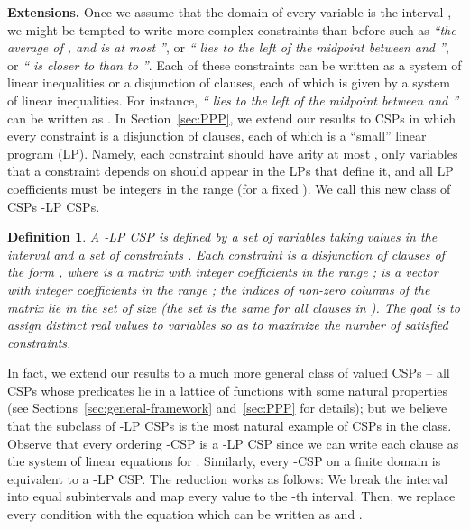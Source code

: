 \documentclass[11pt]{article}
\newtheorem{definition}[theorem]{Definition}
\begin{document}
\medskip

\noindent\textbf{Extensions.}
Once we assume that the domain of every variable is the interval , we might be tempted
to write more complex constraints than before such as
\emph{``the average of ,  and  is at most
''}, or \emph{`` lies to the left of the midpoint between  and ''},
or \emph{`` is closer to  than to ''}.
 Each of these constraints can be written as a system of linear inequalities or a disjunction of clauses,
 each of which is given by a system of linear inequalities. For instance,
  \emph{`` lies to the left of the midpoint between  and ''}
  can be written as  .
In Section~\ref{sec:PPP}, we extend our results to CSPs in which every constraint is a disjunction of clauses, each of which is
a ``small'' linear program (LP).
Namely, each constraint should have arity at most , only variables that a constraint depends on should appear in the LPs that define it,
and all LP coefficients must be integers in the range  (for a fixed ).
We call this new class of CSPs -LP CSPs.

\begin{definition}\label{def:LP-CSP}
A -LP CSP is defined by a set of variables  taking values in the interval 
and a set of constraints . Each constraint  is a disjunction of clauses of the form
, where  is a matrix with integer coefficients in the range ;
 is a vector with integer coefficients in the range ; the indices of  non-zero columns of the matrix
 lie in the set  of size  (the set  is the same for all clauses in ).
The goal is to assign distinct real values to variables  so as to maximize the number of satisfied constraints.
\end{definition}

In fact, we extend our results to a much more general class of valued CSPs -- all CSPs whose
predicates lie in a lattice of functions with some natural properties
(see Sections~\ref{sec:general-framework} and~\ref{sec:PPP}  for details);
but we believe that the subclass of -LP CSPs is the most natural example of CSPs in the class.
Observe that every ordering -CSP is a -LP CSP since we can
write each clause  as the system of linear equations
 for . Similarly, every -CSP on
a finite domain  is equivalent to a -LP CSP. The reduction works as follows:
We break the interval  into  equal subintervals 
and map every value  to the -th interval. Then, we replace every
condition  with the equation 
which can be written as  and .


\medskip
\end{document}
